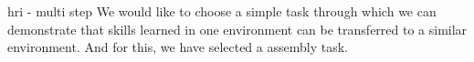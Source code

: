 hri - multi step
We would like to choose a simple task through which we can demonstrate that skills learned in one environment can be transferred to a similar environment. And for this, we have selected a assembly task.
